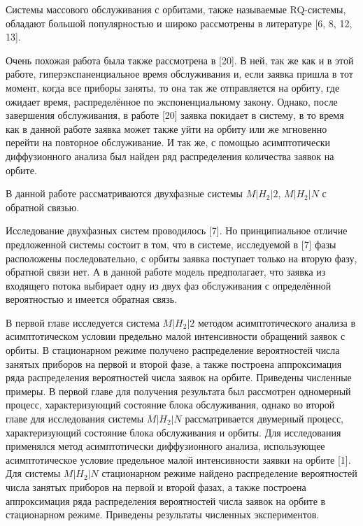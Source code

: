 \hspace*{\parindent}%
Системы массового обслуживания с орбитами, также называемые RQ-системы, обладают большой популярностью и широко рассмотрены в литературе [6, 8, 12, 13]. 

Очень похожая работа была также рассмотрена в [20]. В ней, так же как и в этой работе, гиперэкспаненциальное время обслуживания и, если заявка пришла в тот момент, когда все приборы заняты, то она так же отправляется на орбиту, где ожидает время, распределённое по экспоненциальному закону. Однако, после завершения обслуживания, в работе [20] заявка покидает в систему, в то время как в данной работе заявка может также уйти на орбиту или же мгновенно перейти на повторное обслуживание. И так же, с помощью асимптотически диффузионного анализа был найден ряд распределения количества заявок на орбите.


В данной работе рассматриваются двухфазные системы $M|H_{2}|2$, $M|H_{2}|N$ с обратной связью.

Исследование двухфазных систем проводилось [7]. Но принципиальное отличие предложенной системы состоит в том, что в системе, исследуемой в [7] фазы расположены последовательно, с орбиты заявка поступает только на вторую фазу, обратной связи нет. А в данной работе модель предполагает, что заявка из входящего потока выбирает одну из двух фаз обслуживания с определённой вероятностью и имеется обратная связь.

В первой главе исследуется система $M|H_{2}|2$ методом асимптотического анализа в асимптотическом условии предельно малой интенсивности обращений заявок с орбиты. В стационарном режиме получено распределение вероятностей числа занятых приборов на первой и второй фазе, а также построена аппроксимация ряда распределения вероятностей числа заявок на орбите. Приведены численные примеры.
В первой главе для получения результата был рассмотрен одномерный процесс, характеризующий состояние блока обслуживания, однако во второй главе для исследования системы $M|H_{2}|N$ рассматривается двумерный процесс, характеризующий состояние блока обслуживания и орбиты. Для исследования применялся метод асимптотически диффузионного анализа, использующее асимптотическое условие предельное малой интенсивности заявки на орбите [1].
Для системы $M|H_{2}|N$ стационарном режиме найдено распределение вероятностей числа занятых приборов на первой и второй фазах, а также построена аппроксимация ряда распределения вероятностей числа заявок на орбите в стационарном режиме. Приведены результаты численных экспериментов.


